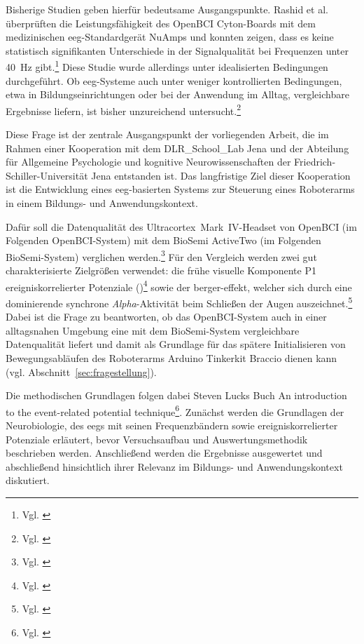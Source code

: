Bisherige Studien geben hierfür bedeutsame Ausgangspunkte. Rashid et al. überprüften die Leistungsfähigkeit des \glqq OpenBCI Cyton\grqq{}-Boards mit dem medizinischen \acrshort{eeg}-Standardgerät \glqq NuAmps\grqq{} und konnten zeigen, dass es keine statistisch signifikanten Unterschiede in der Signalqualität bei Frequenzen unter 40~Hz gibt.\footnote{Vgl. \cite[S.~1]{rashid2018_ads1299}} Diese Studie wurde allerdings unter idealisierten Bedingungen durchgeführt. Ob \acrshort{eeg}-Systeme auch unter weniger kontrollierten Bedingungen, etwa in Bildungseinrichtungen oder bei der Anwendung im Alltag, vergleichbare Ergebnisse liefern, ist bisher unzureichend untersucht.\footnote{Vgl. \cite[S.~12]{sabio2024}}

Diese Frage ist der zentrale Ausgangspunkt der vorliegenden Arbeit, die im Rahmen einer Kooperation mit dem \glqq DLR\_\allowbreak School\_\allowbreak Lab Jena\grqq{} und der Abteilung für Allgemeine Psychologie und kognitive Neurowissenschaften der Friedrich-Schiller-Universität Jena entstanden ist. Das langfristige Ziel dieser Kooperation ist die Entwicklung eines \acrshort{eeg}-basierten Systems zur Steuerung eines Roboterarms in einem Bildungs- und Anwendungskontext.

Dafür soll die Datenqualität des \glqq Ultracortex~Mark~IV\grqq{}-Headset von OpenBCI (im Folgenden OpenBCI-System) mit dem \glqq BioSemi ActiveTwo\grqq{} (im Folgenden BioSemi-System) verglichen werden.\footnote{Vgl. \cite{openbci_ultracortex_shop}} Für den Vergleich werden zwei gut charakterisierte Zielgrößen verwendet: die frühe visuelle Komponente \glqq P1\grqq{} ereigniskorrelierter Potenziale ()\footnote{Vgl. \cite[S.~36]{luck2005}} sowie der \Gls{berger-effekt}, welcher sich durch eine dominierende synchrone \textit{Alpha}-Aktivität beim Schließen der Augen auszeichnet.\footnote{Vgl. \cite{nayak_waveforms}} Dabei ist die Frage zu beantworten, ob das OpenBCI-System auch in einer alltagsnahen Umgebung eine mit dem BioSemi-System vergleichbare Datenqualität liefert und damit als Grundlage für das spätere Initialisieren von Bewegungsabläufen des Roboterarms \glqq Arduino Tinkerkit Braccio\grqq{} dienen kann (vgl. Abschnitt~\ref{sec:fragestellung}).

Die methodischen Grundlagen folgen dabei Steven Lucks Buch \glqq An introduction to the event-related potential technique\grqq{}\footnote{Vgl. \cite{luck2005}}. Zunächst werden die Grundlagen der Neurobiologie, des \acrshort{eeg}s mit seinen Frequenzbändern sowie ereigniskorrelierter Potenziale erläutert, bevor Versuchsaufbau und Auswertungsmethodik beschrieben werden. Anschließend werden die Ergebnisse ausgewertet und abschließend hinsichtlich ihrer Relevanz im Bildungs- und Anwendungskontext diskutiert.



